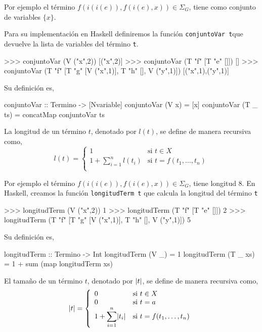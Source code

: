 Por ejemplo el término $f(i(i(e)),f(i(e),x)) \in \Sigma_G$, tiene como
conjunto de variables $\{x\}$.  

Para su implementación en Haskell definiremos la función
\texttt{conjuntoVar t}que devuelve la lista de variables del término
\texttt{t}.

\begin{sesion}
>>> conjuntoVar (V ("x",2))
[("x",2)]
>>> conjuntoVar (T "f" [T "e" []])
[]
>>> conjuntoVar (T "f" [T "g" [V ("x",1)], T "h" [], V ("y",1)])
[("x",1),("y",1)]
\end{sesion}

Su definición es,

\begin{codigo}
conjuntoVar :: Termino -> [Nvariable]
conjuntoVar (V x)    = [x]
conjuntoVar (T _ ts) = concatMap conjuntoVar ts
\end{codigo}

\begin{defi} La longitud de un término $t$, denotado por $l(t)$, se
  define de manera recursiva como,
  \begin{equation*}
    l(t)=
    \left\lbrace
      \begin{array}{ll}
        1 & \text{si } t \in X \\
        1 + \displaystyle \sum^n_{i=1} l(t_i) & \text{si } t = f(t_1, \dots, t_n)\\
      \end{array}
    \right.
  \end{equation*}
\end{defi}

Por ejemplo el término $f(i(i(e)),f(i(e),x)) \in \Sigma_G$, tiene
longitud 8.  
En Haskell, creamos la función \texttt{longitudTerm t} que
calcula la longitud del término \texttt{t}

\begin{sesion}
>>> longitudTerm (V ("x",2))
1
>>> longitudTerm (T "f" [T "e" []])
2
>>> longitudTerm (T "f" [T "g" [V ("x",1)], T "h" [], V ("y",1)])
5
\end{sesion}

Su definición es,

\begin{codigo}
longitudTerm :: Termino -> Int
longitudTerm (V _)    = 1
longitudTerm (T _ xs) = 1 + sum (map longitudTerm xs)
\end{codigo}

\begin{defi} El tamaño de un término $t$, denotado por $\lvert t\rvert $, se
  define de manera recursiva como,
  \begin{equation*}
    \lvert t\rvert=
    \left\lbrace
      \begin{array}{ll}
        0 & \text{si } t \in X \\
        0 & \text{si } t = a \\
        1 + \displaystyle \sum^n_{i=1} \lvert t_i\rvert & \text{si } t = f(t_1, \dots, t_n)\\
      \end{array}
    \right.
  \end{equation*}
\end{defi}

